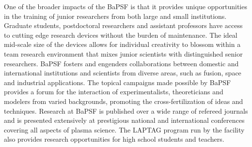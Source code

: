 \documentclass[11pt]{article}
\begin{document}
One of the broader impacts of the BaPSF is that it provides unique
opportunities in the training of junior researchers from both large and
small institutions. Graduate students, postdoctoral researchers and
assistant professors have access to cutting edge research devices
without the burden of maintenance. The ideal mid-scale size of the
devices allows for individual creativity to blossom within a team
research environment that mixes junior scientists with distinguished senior
researchers. BaPSF fosters and engenders collaborations between domestic
and international institutions and scientists from diverse
areas, such as fusion, space and industrial applications. The topical
campaigns made possible by BaPSF provides a forum for the interaction of
experimentalists, theoreticians and modelers from varied backgrounds,
promoting the cross-fertilization of ideas and techniques. Research at
BaPSF is published over a wide range of refereed journals and is
presented extensively at prestigious national and international
conferences covering all aspects of plasma science. The LAPTAG program
run by the facility also provides research opportunities for high school
students and teachers.


\newpage

\setcounter{page}{1}

%
%

  
\end{document}
